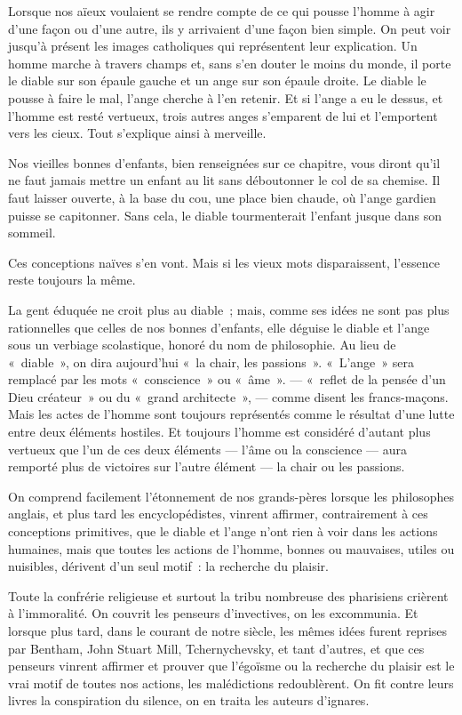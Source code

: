 \documentclass[french,twoside]{book} %
\begin{document}
\noindent Lorsque nos aïeux voulaient se rendre compte de ce qui pousse l’homme à agir d’une façon ou d’une autre, ils y arrivaient d’une façon bien simple. On peut voir jusqu’à présent les images catholiques qui représentent leur explication. Un homme marche à travers champs et, sans s’en douter le moins du monde, il porte le diable sur son épaule gauche et un ange sur son épaule droite. Le diable le pousse à faire le mal, l’ange cherche à l’en retenir. Et si l’ange a eu le dessus, et l’homme est resté vertueux, trois autres anges s’emparent de lui et l’emportent vers les cieux. Tout s’explique ainsi à merveille.\par
Nos vieilles bonnes d’enfants, bien renseignées sur ce chapitre, vous diront qu’il ne faut jamais mettre un enfant au lit sans déboutonner le col de sa chemise. Il faut laisser ouverte, à la base du cou, une place bien chaude, où l’ange gardien puisse se capitonner. Sans cela, le diable tourmenterait l’enfant jusque dans son sommeil.\par
Ces conceptions naïves s’en vont. Mais si les vieux mots disparaissent, l’essence reste toujours la même.\par
La gent éduquée ne croit plus au diable ; mais, comme ses idées ne sont pas plus rationnelles que celles de nos bonnes d’enfants, elle déguise le diable et l’ange sous un verbiage scolastique, honoré du nom de philosophie. Au lieu de « diable », on dira aujourd’hui « la chair, les passions ». « L’ange » sera remplacé par les mots « conscience » ou « âme ». — « reflet de la pensée d’un Dieu créateur » ou du « grand architecte », — comme disent les francs-maçons. Mais les actes de l’homme sont toujours représentés comme le résultat d’une lutte entre deux éléments hostiles. Et toujours l’homme est considéré d’autant plus vertueux que l’un de ces deux éléments — l’âme ou la conscience — aura remporté plus de victoires sur l’autre élément — la chair ou les passions.\par
 On comprend facilement l’étonnement de nos grands-pères lorsque les philosophes anglais, et plus tard les encyclopédistes, vinrent affirmer, contrairement à ces conceptions primitives, que le diable et l’ange n’ont rien à voir dans les actions humaines, mais que toutes les actions de l’homme, bonnes ou mauvaises, utiles ou nuisibles, dérivent d’un seul motif : la recherche du plaisir.\par
Toute la confrérie religieuse et surtout la tribu nombreuse des pharisiens crièrent à l’immoralité. On couvrit les penseurs d’invectives, on les excommunia. Et lorsque plus tard, dans le courant de notre siècle, les mêmes idées furent reprises par Bentham, John Stuart Mill, Tchernychevsky, et tant d’autres, et que ces penseurs vinrent affirmer et prouver que l’égoïsme ou la recherche du plaisir est le vrai motif de toutes nos actions, les malédictions redoublèrent. On fit contre leurs livres la conspiration du silence, on en traita les auteurs d’ignares.\par
\end{document}
